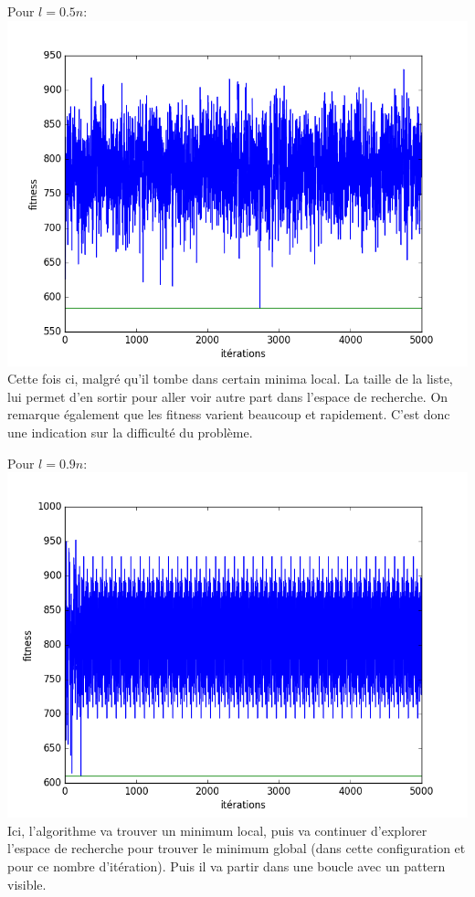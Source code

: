 \documentclass[a4paper, 11pt]{article}
\begin{document}
Pour $l=0.5n$:
\\
\includegraphics[scale=0.5]{l_0_5}
\\
Cette fois ci, malgré qu'il tombe dans certain minima local. La taille de la liste, lui permet d'en sortir pour aller voir autre part dans
l'espace de recherche.
On remarque également que les fitness varient beaucoup et rapidement. C'est donc une indication sur la difficulté du problème.

Pour $l=0.9n$:
\\
\includegraphics[scale=0.5]{l_0_9}
\\
Ici, l'algorithme va trouver un minimum local, puis va continuer d'explorer l'espace de recherche pour trouver le minimum global (dans
cette configuration et pour ce nombre d'itération). Puis il va partir dans une boucle avec un pattern visible.
\end{document}
